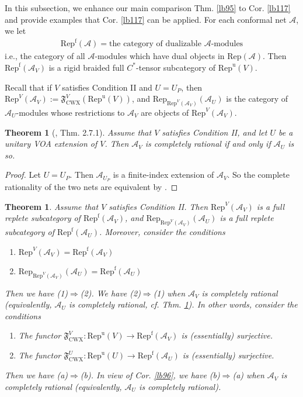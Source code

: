 \documentclass[11pt,b5paper,notitlepage]{article}
\theoremstyle{definition}
\theoremstyle{plain}
\newtheorem{thm}[df]{Theorem}
\newcommand{\fk}{\mathfrak}
\newcommand{\mc}{\mathcal}
\newcommand{\Rep}{\mathrm{Rep}}
\newcommand{\Repf}{\mathrm{Rep}^{\mathrm f}}
\newcommand{\uni}{\mathrm{u}}
\newcommand{\RepV}{{\mathrm{Rep}^\uni(V)}}
\newcommand{\RepU}{\mathrm{Rep}^\uni(U)}
\newcommand{\CWX}{{\scriptscriptstyle \mathrm{CWX}}}
\newcommand{\FVCWX}{{\mathfrak F^V_{\scriptscriptstyle \mathrm{CWX}}}}
\numberwithin{equation}{section}
\begin{document}
In this subsection, we enhance our main comparison Thm. \ref{lb95} to Cor. \ref{lb117} and provide examples that Cor. \ref{lb117} can be applied. For each conformal net $\mc A$, we let
\begin{align*}
\Repf(\mc A)=\text{the category of dualizable $\mc A$-modules}
\end{align*}
i.e., the category of all $\mc A$-modules which have dual objects in $\Rep(\mc A)$. Then $\Repf(\mc A_V)$ is a rigid braided full $C^*$-tensor subcategory of $\RepV$.


Recall that if $V$ satisfies Condition II and $U=U_P$, then $\Rep^V(\mc A_V):=\FVCWX(\RepV)$, and $\Rep_{\Rep^V(\mc A_V)}(\mc A_U)$ is the category of $\mc A_U$-modules whose restrictions to $\mc A_V$ are objects of $\Rep^V(\mc A_V)$.




\begin{thm}[\cite{Gui20}, Thm. 2.7.1]\label{lb115}
Assume that $V$ satisfies Condition II, and let $U$ be a unitary VOA extension of $V$. Then $\mc A_V$ is completely rational if and only if $\mc A_U$ is so.
\end{thm}

\begin{proof}
Let $U=U_P$. Then $\mc A_{U_P}$ is a finite-index extension of $\mc A_V$. So the complete rationality of the two nets are equivalent by \cite[Thm. 24]{Lon03}.
\end{proof}



\begin{thm}\label{lb97}
Assume that $V$ satisfies Condition II. Then $\Rep^V(\mc A_V)$ is a full replete subcategory of $\Repf(\mc A_V)$, and $\Rep_{\Rep^V(\mc A_V)}(\mc A_U)$ is a full replete subcategory of $\Repf(\mc A_U)$. Moreover, consider the conditions
\begin{enumerate}[label=(\arabic*)]
\item $\Rep^V(\mc A_V)=\Repf(\mc A_V)$
\item $\Rep_{\Rep^V(\mc A_V)}(\mc A_U)=\Repf(\mc A_U)$
\end{enumerate}
Then we have (1)$\Rightarrow$(2). We have (2)$\Rightarrow$(1) when $\mc A_V$ is completely rational (equivalently, $\mc A_U$ is completely rational, cf. Thm. \ref{lb115}). In other words, consider the conditions
\begin{enumerate}[label=(\alph*)]
\item The functor $\fk F^V_\CWX:\RepV\rightarrow\Repf(\mc A_V)$ is (essentially) surjective.
\item The functor $\fk F^U_\CWX:\RepU\rightarrow\Repf(\mc A_U)$ is (essentially) surjective.
\end{enumerate}
Then we have (a)$\Rightarrow$(b). In view of Cor. \ref{lb96}, we have (b)$\Rightarrow$(a) when $\mc A_V$ is completely rational (equivalently, $\mc A_U$ is completely rational).
\end{thm}
\end{document}
